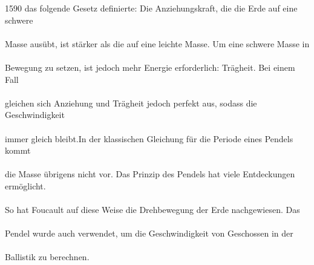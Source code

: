 \documentclass[12pt, a4paper, twoside]{article}
\begin{document}
    1590 das folgende Gesetz definierte: Die Anziehungskraft, die die Erde auf eine schwere\\\\
    Masse ausübt, ist stärker als die auf eine leichte Masse. Um eine schwere Masse in \\\\
    Bewegung zu setzen, ist jedoch mehr Energie erforderlich: Trägheit. Bei einem Fall \\\\
    gleichen sich Anziehung und Trägheit jedoch perfekt aus, sodass die Geschwindigkeit \\\\
    immer gleich bleibt.In der klassischen Gleichung für die Periode eines Pendels kommt \\\\ 
    die Masse übrigens nicht vor. Das Prinzip des Pendels hat viele Entdeckungen ermöglicht. \\\\
    So hat Foucault auf diese Weise die Drehbewegung der Erde nachgewiesen. Das  \\\\
    Pendel wurde auch verwendet, um die Geschwindigkeit von Geschossen in der \\\\
    Ballistik zu berechnen.
    \newpage
\end{document}
